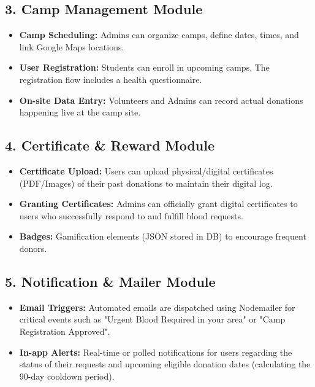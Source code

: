 \documentclass[12pt, a4paper]{article}
\begin{document}
\subsection{3. Camp Management Module}
\begin{itemize}
    \item \textbf{Camp Scheduling:} Admins can organize camps, define dates, times, and link Google Maps locations.
    \item \textbf{User Registration:} Students can enroll in upcoming camps. The registration flow includes a health questionnaire.
    \item \textbf{On-site Data Entry:} Volunteers and Admins can record actual donations happening live at the camp site.
\end{itemize}

\subsection{4. Certificate \& Reward Module}
\begin{itemize}
    \item \textbf{Certificate Upload:} Users can upload physical/digital certificates (PDF/Images) of their past donations to maintain their digital log.
    \item \textbf{Granting Certificates:} Admins can officially grant digital certificates to users who successfully respond to and fulfill blood requests.
    \item \textbf{Badges:} Gamification elements (JSON stored in DB) to encourage frequent donors.
\end{itemize}

\subsection{5. Notification \& Mailer Module}
\begin{itemize}
    \item \textbf{Email Triggers:} Automated emails are dispatched using Nodemailer for critical events such as "Urgent Blood Required in your area" or "Camp Registration Approved".
    \item \textbf{In-app Alerts:} Real-time or polled notifications for users regarding the status of their requests and upcoming eligible donation dates (calculating the 90-day cooldown period).
\end{itemize}
\end{document}
